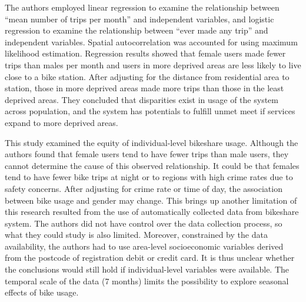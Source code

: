 \documentclass[11pt]{article}
\begin{document}
The authors employed linear regression to examine the relationship between “mean number of trips per month” and independent variables, and logistic regression to examine the relationship between “ever made any trip” and independent variables. Spatial autocorrelation was accounted for using maximum likelihood estimation. Regression results showed that female users made fewer trips than males per month and users in more deprived areas are less likely to live close to a bike station. After adjusting for the distance from residential area to station, those in more deprived areas made more trips than those in the least deprived areas. They concluded that disparities exist in usage of the system across population, and the system has potentials to fulfill unmet meet if services expand to more deprived areas. 

This study examined the equity of individual-level bikeshare usage. Although the authors found that female users tend to have fewer trips than male users, they cannot determine the cause of this observed relationship. It could be that females tend to have fewer bike trips at night or to regions with high crime rates due to safety concerns. After adjusting for crime rate or time of day, the association between bike usage and gender may change. This brings up another limitation of this research resulted from the use of automatically collected data from bikeshare system. The authors did not have control over the data collection process, so what they could study is also limited. Moreover, constrained by the data availability, the authors had to use area-level socioeconomic variables derived from the postcode of registration debit or credit card. It is thus unclear whether the conclusions would still hold if individual-level variables were available. The temporal scale of the data (7 months) limits the possibility to explore seasonal effects of bike usage. 


\end{document}
